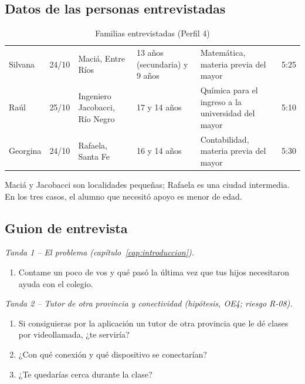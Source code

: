 \subsection{Datos de las personas entrevistadas}

\begin{table}[H]
    \centering
    \caption{Familias entrevistadas (Perfil 4)}
    \label{tab:familias-entrevistadas}
    \small
    \begin{tabularx}{\textwidth}{l l l L L l}
        \toprule
         &  &  &  &  &  \\
        \midrule
        Silvana & 24/10 & Maciá, Entre Ríos & 13 años (secundaria) y 9 años & Matemática, materia previa del mayor & 5:25 \\
        Raúl & 25/10 & Ingeniero Jacobacci, Río Negro & 17 y 14 años & Química para el ingreso a la universidad del mayor & 5:10 \\
        Georgina & 24/10 & Rafaela, Santa Fe & 16 y 14 años & Contabilidad, materia previa del mayor & 5:30 \\
        \bottomrule
    \end{tabularx}
\end{table}

Maciá y Jacobacci son localidades pequeñas; Rafaela es una ciudad
intermedia. En los tres casos, el alumno que necesitó apoyo es menor de
edad.

\subsection{Guion de entrevista}\label{sec:guion-perfil4}

\emph{Tanda 1 -- El problema (capítulo~\ref{cap:introduccion}).}

\begin{enumerate}
    \item Contame un poco de vos y qué pasó la última vez que tus hijos
          necesitaron ayuda con el colegio.
\end{enumerate}

\emph{Tanda 2 -- Tutor de otra provincia y conectividad (hipótesis, OE4;
riesgo R-08).}

\begin{enumerate}[resume]
    \item Si consiguieras por la aplicación un tutor de otra provincia que
          le dé clases por videollamada, ¿te serviría?
    \item ¿Con qué conexión y qué dispositivo se conectarían?
    \item ¿Te quedarías cerca durante la clase?
\end{enumerate}

